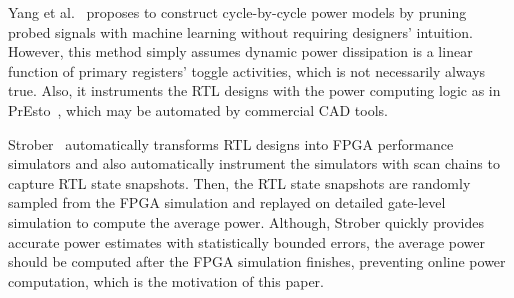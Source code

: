 Yang et al.~\cite{Yang2015} proposes to construct cycle-by-cycle power models
by pruning probed signals with machine learning without requiring designers' intuition.
However, this method simply assumes dynamic power dissipation is a linear function of
primary registers' toggle activities, which is not necessarily always true.
Also, it instruments the RTL designs with the power computing logic as in PrEsto~\cite{Sunwoo2010},
which may be automated by commercial CAD tools.

Strober~\cite{Kim2016} automatically transforms RTL designs into FPGA performance simulators
and also automatically instrument the simulators with scan chains to capture RTL state snapshots.
Then, the RTL state snapshots are randomly sampled from the FPGA simulation and replayed on
detailed gate-level simulation to compute the average power. Although, Strober quickly provides
accurate power estimates with statistically bounded errors, the average power should be computed 
after the FPGA simulation finishes, preventing online power computation, which is the motivation
of this paper.